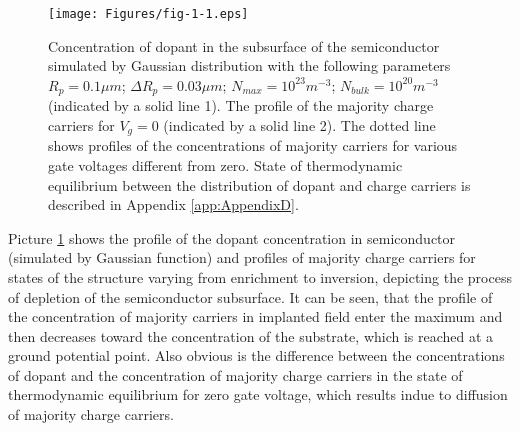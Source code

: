 \begin{figure}[h!]\centering
\texttt{[image: Figures/fig-1-1.eps]}
\captionsetup{justification=raggedright, singlelinecheck=false}
\iffalse
\caption[Priebeh koncentrácie prímesí v podpovrchovej oblasti
  polovodiča]{Priebeh koncentrácie prímesí v podpovrchovej oblasti
  polovodiča simulovaný Gaussovským rozložením \cite{1.11} s
  následovnými parametrami $R_p=0.1 \mu{m}$; $\Delta{R_p}=0.03
  \mu{m}$; $N_{max}=10^{23} m^{-3}$; $N_{bulk}=10^{20} m^{-3}$
  (označený plnou čiarou 1). Priebeh majoritných nosičov náboja pre
  $V_g=0$ (označený plnou čiarou 2). Bodkovanými čiarami sú znázornené
  priebehy koncentrácií majoritných nosičov pre napätia hradla rôzne
  od nuly. Stav termodynamickej rovnováhy medzi rozložením prímesí a
  nosičov náboja je popísaný v dodatku \ref{app:AppendixD}.}
\fi
\caption[Concentration of dopant in the subsurface of the
  semiconductor] {Concentration of dopant in the subsurface of the
  semiconductor simulated by Gaussian distribution \cite{1.11} with
  the following parameters $R_p=0.1 \mu{m}$; $\Delta{R_p}=0.03\mu{m}$;
  $N_{max}=10^{23} m^{-3}$; $N_{bulk}=10^{20} m^{-3}$ (indicated by a
  solid line 1). The profile of the majority charge carriers for
  $V_g=0$ (indicated by a solid line 2). The dotted line shows
  profiles of the concentrations of majority carriers for various gate
  voltages different from zero. State of thermodynamic equilibrium
  between the distribution of dopant and charge carriers is described
  in Appendix \ref{app:AppendixD}.}
\label{fig:1.1}
\end{figure}

\iffalse
\par Na obrázku \ref{fig:1.1} je znázornený priebeh koncentrácie
prímesí v polovodiči (simulovaný Gaussovským priebehom) a priebehy
majoritných nosičov náboja pre stav štruktúry meniaci sa od obohatenia
do inverzie, znázorňujúce dej ochudobňovania podpovrchovej oblasti
polovodiča. Tu vidieť, že priebeh koncentrácie majoritných nosičov v
implantovanej oblasti nadobúda maximum a potom klesá ku koncentrácii
substrátu, ktorú dosiahne v bode nulového elektrického potenciálu.
Zároveň je zrejmý rozdiel medzi priebehom koncentrácie prímesí a
priebehom koncentrácie majoritných nosičov náboja v stave
termodynamickej rovnováhy pre nulové napätie hradla, ktorý vzniká v
dôsledku difúzie majoritných nosičov náboja.
\fi
\par Picture \ref{fig:1.1} shows the profile of the dopant
concentration in semiconductor (simulated by Gaussian function) and
profiles of majority charge carriers for states of the structure
varying from enrichment to inversion, depicting the process of
depletion of the semiconductor subsurface. It can be seen, that the
profile of the concentration of majority carriers in implanted field
enter the maximum and then decreases toward the concentration of the
substrate, which is reached at a ground potential point. Also obvious
is the difference between the concentrations of dopant and the
concentration of majority charge carriers in the state of
thermodynamic equilibrium for zero gate voltage, which results indue
to diffusion of majority charge carriers.

